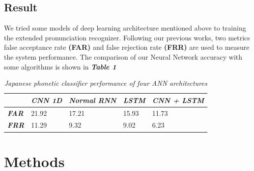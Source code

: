 \documentclass[conference]{IEEEtran}
\begin{document}
\subsection{Result}

We tried some models of deep learning architecture mentioned above to training the extended pronunciation recognizer. Following our previous works, two metrics false acceptance rate \textbf{(FAR)} and false rejection rate \textbf{(FRR)} are used to measure the system performance. The comparison of our Neural Network accuracy with some algorithms is shown in \textit{\textbf{Table 1}}

\begin{table}[]
\centering
\caption{\textit{Japanese phonetic classifier performance of four ANN architectures}}
\label{my-label}
\begin{tabular}{|l|l|l|l|l|}
\hline
                                                           & {\color[HTML]{333333} \textit{\textbf{CNN 1D}}} & {\color[HTML]{333333} \textit{\textbf{Normal RNN}}} & {\color[HTML]{333333} \textit{\textbf{LSTM}}} & {\color[HTML]{333333} \textit{\textbf{CNN + LSTM}}} 
                                                           \\ \hline
{\color[HTML]{333333} \textit{\textbf{FAR}}} & 21.92                                       & 17.21 & 
15.93 & 
11.73                                                  \\ \hline
{\color[HTML]{333333} \textit{\textbf{FRR}}} & 11.29                                       & 9.32 & 
9.02                                       & 6.23                                               \\ \hline
\end{tabular}
\end{table}

\section{Methods}
\end{document}
